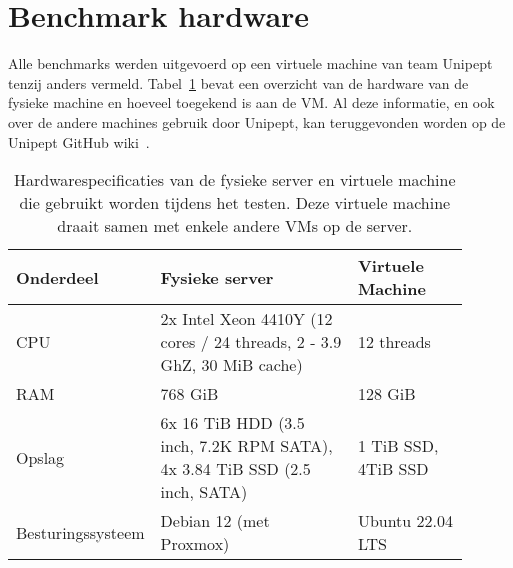 \section{Benchmark hardware}\label{sec:benchmark-hardware}
Alle benchmarks werden uitgevoerd op een virtuele machine van team Unipept tenzij anders vermeld.
Tabel~\ref{tab:Matt_hardware} bevat een overzicht van de hardware van de fysieke machine en hoeveel toegekend is aan de VM\@.
Al deze informatie, en ook over de andere machines gebruik door Unipept, kan teruggevonden worden op de Unipept GitHub wiki~\cite{unipept_infrastructure}.
\\
\begin{table}[h!]
    \centering
    \begin{tabular}{p{0.20\linewidth}p{0.45\linewidth}p{0.25\linewidth}}
        Onderdeel         & Fysieke server                                                            & Virtuele Machine    \\
        \hline\hline
        CPU               & 2x Intel Xeon 4410Y (12 cores / 24 threads, 2 - 3.9 GhZ, 30 MiB cache)    & 12 threads          \\
        RAM               & 768 GiB                                                                   & 128 GiB             \\
        Opslag            & 6x 16 TiB HDD (3.5 inch, 7.2K RPM SATA), 4x 3.84 TiB SSD (2.5 inch, SATA) & 1 TiB SSD, 4TiB SSD \\
        Besturingssysteem & Debian 12 (met Proxmox)                                                   & Ubuntu 22.04 LTS    \\
        \hline
    \end{tabular}
    \caption{Hardwarespecificaties van de fysieke server en virtuele machine die gebruikt worden tijdens het testen. Deze virtuele machine draait samen met enkele andere VMs op de server.}
    \label{tab:Matt_hardware}
\end{table}

